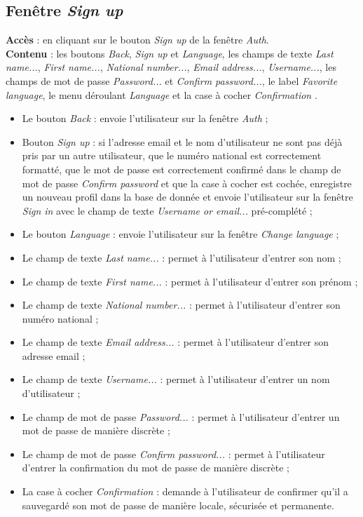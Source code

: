 \documentclass{article}
\newcommand{\navbutton}[2]{Le bouton \emph{#1} : envoie l'utilisateur sur la fenêtre \emph{#2}}
\newcommand{\textfield}[2]{Le champ de texte \emph{#1} : permet à l'utilisateur d'entrer #2}
\newcommand{\passwordfield}[2]{Le champ de mot de passe \emph{#1} : permet à l'utilisateur d'entrer #2 de manière discrète}
\newcommand{\access}[1]{ \noindent\textbf{Accès} : #1 \\}
\newcommand{\content}[1]{\textbf{Contenu} : #1}
\begin{document}
\subsection{Fenêtre \emph{Sign up}}
\access{en cliquant sur le bouton \emph{Sign up} de la fenêtre \emph{Auth}.}
\content{les boutons \emph{Back}, \emph{Sign up} et \emph{Language}, les champs de texte \emph{Last name...}, \emph{First name...}, \emph{National number...}, \emph{Email address...}, \emph{Username...}, les champs de mot de passe \emph{Password...} et \emph{Confirm password...}, le label \emph{Favorite language}, le menu déroulant \emph{Language} et la case à cocher \emph{Confirmation} .}
\begin{itemize}
\item \navbutton{Back}{Auth} ;
\item Bouton \emph{Sign up} : si l'adresse email et le nom d'utilisateur ne sont pas déjà pris par un autre utilisateur, que le numéro national est correctement formatté, que le mot de passe est correctement confirmé dans le champ de mot de passe \emph{Confirm password} et que la case à cocher est cochée, enregistre un nouveau profil dans la base de donnée et envoie l'utilisateur sur la fenêtre \emph{Sign in} avec le champ de texte \emph{Username or email...} pré-complété ;
\item \navbutton{Language}{Change language} ;
\item \textfield{Last name...}{son nom} ;
\item \textfield{First name...}{son prénom} ;
\item \textfield{National number...}{son numéro national} ;
\item \textfield{Email address...}{son adresse email} ;
\item \textfield{Username...}{un nom d'utilisateur} ;
\item \passwordfield{Password...}{un mot de passe} ;
\item \passwordfield{Confirm password...}{la confirmation du mot de passe} ;
\item La case à cocher \emph{Confirmation} : demande à l'utilisateur de confirmer qu'il a sauvegardé son mot de passe de manière locale, sécurisée et permanente.
\end{itemize}
\end{document}
